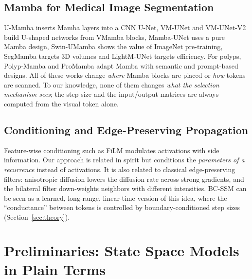 \documentclass[journal]{IEEEtran}
\begin{document}
\subsection{Mamba for Medical Image Segmentation}
U-Mamba \cite{ma2024umamba} inserts Mamba layers into a CNN U-Net, VM-UNet \cite{ruan2024vmunet} and VM-UNet-V2 \cite{zhang2024vmunetv2} build U-shaped networks from VMamba blocks, Mamba-UNet \cite{wang2024mambaunet} uses a pure Mamba design, Swin-UMamba \cite{liu2024swinumamba} shows the value of ImageNet pre-training, SegMamba \cite{xing2024segmamba} targets 3D volumes and LightM-UNet \cite{liao2024lightmunet} targets efficiency. For polyps, Polyp-Mamba \cite{xu2024polypmamba} and ProMamba \cite{xie2024promamba} adapt Mamba with semantic and prompt-based designs. All of these works change \emph{where} Mamba blocks are placed or \emph{how} tokens are scanned. To our knowledge, none of them changes \emph{what the selection mechanism sees}; the step size and the input/output matrices are always computed from the visual token alone.

\subsection{Conditioning and Edge-Preserving Propagation}
Feature-wise conditioning such as FiLM \cite{perez2018film} modulates activations with side information. Our approach is related in spirit but conditions the \emph{parameters of a recurrence} instead of activations. It is also related to classical edge-preserving filters: anisotropic diffusion \cite{perona1990anisotropic} lowers the diffusion rate across strong gradients, and the bilateral filter \cite{tomasi1998bilateral} down-weights neighbors with different intensities. BC-SSM can be seen as a learned, long-range, linear-time version of this idea, where the ``conductance'' between tokens is controlled by boundary-conditioned step sizes (Section~\ref{sec:theory}).

\section{Preliminaries: State Space Models in Plain Terms}
\label{sec:prelim}
\end{document}

